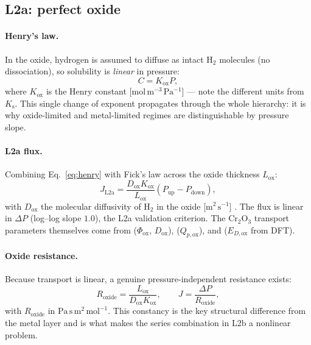 \documentclass[11pt,a4paper]{article}
\newcommand{\Pup}{P_{\mathrm{up}}}
\newcommand{\Pdown}{P_{\mathrm{down}}}
\newcommand{\Ks}{K_{\mathrm{s}}}
\newcommand{\Kox}{K_{\mathrm{ox}}}
\newcommand{\Dox}{D_{\mathrm{ox}}}
\newcommand{\Lox}{L_{\mathrm{ox}}}
\newcommand{\Rox}{R_{\mathrm{oxide}}}
\begin{document}
\subsection{L2a: perfect oxide}

\paragraph{Henry's law.} In the oxide, hydrogen is assumed to diffuse as
intact $\mathrm{H_2}$ molecules (no dissociation), so solubility is
\emph{linear} in pressure:
\begin{equation}
  C = \Kox P,
  \label{eq:henry}
\end{equation}
where $\Kox$ is the Henry constant [$\mathrm{mol\,m^{-3}\,Pa^{-1}}$] --- note
the different units from $\Ks$. This single change of exponent propagates
through the whole hierarchy: it is why oxide-limited and metal-limited regimes
are distinguishable by pressure slope.

\paragraph{L2a flux.} Combining Eq.~\eqref{eq:henry} with Fick's law across
the oxide thickness $\Lox$:
\begin{equation}
  J_{\mathrm{L2a}} = \frac{\Dox \Kox}{\Lox}\left(\Pup - \Pdown\right),
  \label{eq:L2aflux}
\end{equation}
with $\Dox$ the molecular diffusivity of $\mathrm{H_2}$ in the oxide
[$\mathrm{m^2\,s^{-1}}$] \citep{strehlow1974,hollenberg1995}. The flux is
linear in $\Delta P$ (log--log slope $1.0$), the L2a validation criterion.
The $\mathrm{Cr_2O_3}$ transport parameters themselves come from
\citet{nemanic2023} ($\Phi_{\mathrm{ox}}$, $\Dox$), \citet{stover1986}
($Q_{p,\mathrm{ox}}$), and \citet{chen2011} ($E_{D,\mathrm{ox}}$ from DFT).

\paragraph{Oxide resistance.} Because transport is linear, a genuine
pressure-independent resistance exists:
\begin{equation}
  \Rox = \frac{\Lox}{\Dox \Kox},
  \qquad J = \frac{\Delta P}{\Rox},
  \label{eq:Rox}
\end{equation}
with $\Rox$ in $\mathrm{Pa\,s\,m^{2}\,mol^{-1}}$. This constancy is the key
structural difference from the metal layer and is what makes the series
combination in L2b a nonlinear problem.
\end{document}
